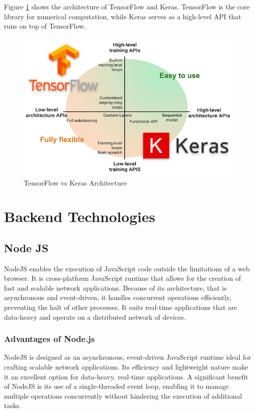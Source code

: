 Figure \ref{fig:keras} shows the architecture of TensorFlow and Keras. TensorFlow is the core library for numerical computation, while Keras serves as a high-level API
that runs on top of TensorFlow. 

\begin{figure}[H]
    \centering
    \includegraphics[width=0.8\linewidth]{images/keras.png}
    \caption{TensorFlow vs Keras Architecture}
    \label{fig:keras}    
\end{figure}


\section{Backend Technologies}

\subsection{Node JS}

NodeJS enables the execution of JavaScript code outside the limitations of a web browser. It is cross-platform JavaScript runtime that allows for the creation of
fast and scalable network applications. Because of its architecture, that is asynchronous and event-driven, it handles concurrent operations efficiently, preventing the halt of
other processes. It suits real-time applications that are data-heavy and operate on a distributed network of devices. \cite{nodejs}

\subsubsection*{Advantages of Node.js}
NodeJS is designed as an asynchronous, event-driven JavaScript runtime ideal for crafting scalable network applications. Its efficiency and lightweight nature make it an excellent option for data-heavy, real-time applications.\cite{tilkov}
A significant benefit of NodeJS is its use of a single-threaded event loop, enabling it to manage multiple operations concurrently without hindering the execution of additional tasks.

